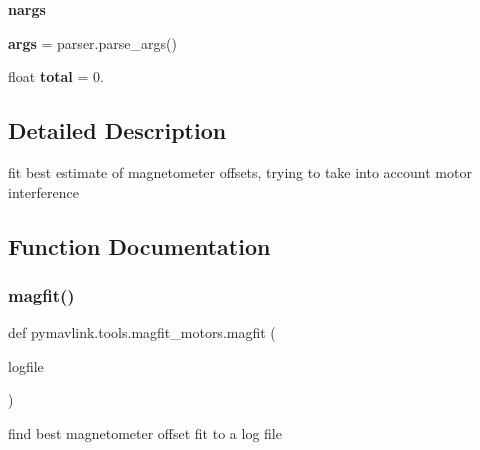 \begin{DoxyCompactItemize}
\mbox{\label{namespacepymavlink_1_1tools_1_1magfit__motors_a2ac8e4039cfbd11b92b7a46d3384ebe4}} 
{\bfseries nargs}
\item 
\mbox{\label{namespacepymavlink_1_1tools_1_1magfit__motors_a7700e9fef248605dc567389a42c901a3}} 
{\bfseries args} = parser.\+parse\+\_\+args()
\item 
\mbox{\label{namespacepymavlink_1_1tools_1_1magfit__motors_a8290263a984c6842655820ea9f2437e6}} 
float {\bfseries total} = 0.
\end{DoxyCompactItemize}


\subsection{Detailed Description}
\begin{DoxyVerb}fit best estimate of magnetometer offsets, trying to take into account motor interference
\end{DoxyVerb}
 

\subsection{Function Documentation}
\mbox{\label{namespacepymavlink_1_1tools_1_1magfit__motors_a77e8faeadc7b37710f2d336d744e6492}} 
\subsubsection{\texorpdfstring{magfit()}{magfit()}}
{\footnotesize\ttfamily def pymavlink.\+tools.\+magfit\+\_\+motors.\+magfit (\begin{DoxyParamCaption}\item[{}]{logfile }\end{DoxyParamCaption})}

\begin{DoxyVerb}find best magnetometer offset fit to a log file\end{DoxyVerb}
 \mbox{\label{namespacepymavlink_1_1tools_1_1magfit__motors_a976924d27c33f71974f3d7c70674cf82}} 
